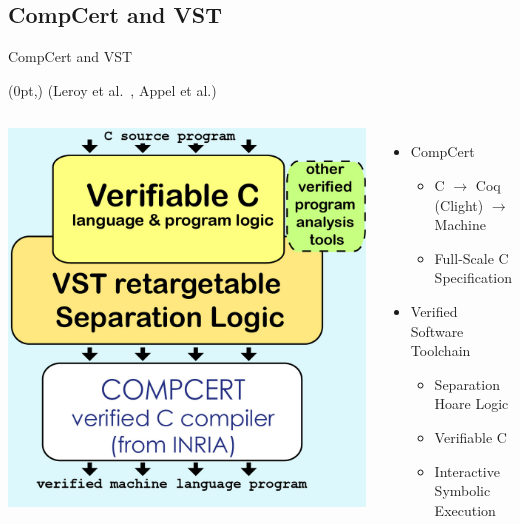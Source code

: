 \documentclass[professionalfonts, xcolor=table]{beamer}
\newcommand\credit[1]{%
  \begin{textblock*}{\paperwidth}(0pt,\textheight)
    \raggedleft #1\hspace{.5em}
\end{textblock*}}
\begin{document}
\subsection{CompCert and VST}
\begin{frame}{CompCert and VST}
  \credit{\footnotesize (Leroy et al.\ , Appel et al.)}
  \begin{columns}[c]
    \centering
    \includegraphics[width=\textwidth,keepaspectratio]{VST-diagram.jpg}
    \begin{itemize}
    \item CompCert
      \begin{itemize}
      \item<2-> C $\rightarrow$ Coq (Clight) $\rightarrow$ Machine
      \item<3-> Full-Scale C Specification
      \end{itemize}
    \item<4-> Verified Software Toolchain
      \begin{itemize}
      \item<5-> Separation Hoare Logic
      \item<6-> Verifiable C
      \item<7-> Interactive Symbolic Execution
      \end{itemize}
    \end{itemize}
  \end{columns}
\end{frame}
\end{document}
